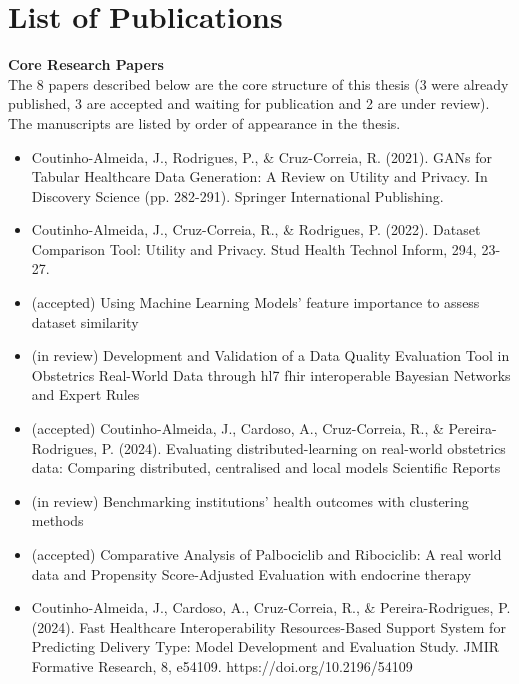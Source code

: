 \chapter*{List of Publications}



\textbf{Core Research Papers} \\
The 8 papers described below are the core structure of this thesis (3 were already published, 3 are accepted and waiting for publication and 2 are under review). The manuscripts are listed by order of appearance in the thesis.
\\
\begin{itemize}
    \item Coutinho-Almeida, J., Rodrigues, P., \& Cruz-Correia, R. (2021). GANs for Tabular Healthcare Data Generation: A Review on Utility and Privacy. In Discovery Science (pp. 282-291). Springer International Publishing.

    \item Coutinho-Almeida, J., Cruz-Correia, R., \& Rodrigues, P. (2022). Dataset Comparison Tool: Utility and Privacy. Stud Health Technol Inform, 294, 23-27.
    

    \item (accepted) Using Machine Learning Models' feature importance to assess dataset similarity 


    \item (in review) Development and Validation of a Data Quality Evaluation Tool in Obstetrics Real-World Data through \ac{hl7} \ac{fhir} interoperable Bayesian Networks and Expert Rules
    
    \item (accepted) Coutinho-Almeida, J., Cardoso, A., Cruz-Correia, R., \& Pereira-Rodrigues, P. (2024). Evaluating distributed-learning on real-world obstetrics data: Comparing distributed, centralised and local models Scientific Reports 
    
    \item (in review) Benchmarking institutions' health outcomes with clustering methods 

    
    \item (accepted) Comparative Analysis of Palbociclib and Ribociclib: A real world data and Propensity Score-Adjusted Evaluation with endocrine therapy
     
    
    \item Coutinho-Almeida, J., Cardoso, A., Cruz-Correia, R., \& Pereira-Rodrigues, P. (2024). Fast Healthcare Interoperability Resources-Based Support System for Predicting Delivery Type: Model Development and Evaluation Study. JMIR Formative Research, 
    8, e54109. https://doi.org/10.2196/54109

\end{itemize}



